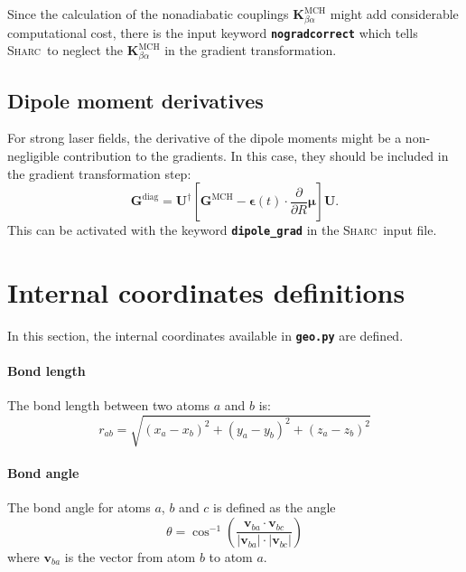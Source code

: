 \documentclass[a4paper,10pt,DIV=15,openany,twoside=false]{scrbook}
\newcommand{\sharc}{\textsc{Sharc}}
\newcommand{\ttt}[1]{\textbf{\texttt{#1}}}
\newcommand{\VEC}[1]{\ensuremath{\mathbf{#1}}}
\begin{document}
Since the calculation of the nonadiabatic couplings $\VEC{K}^{\text{MCH}}_{\beta\alpha}$ might add considerable computational cost, there is the input keyword \ttt{nogradcorrect} which tells \sharc\ to neglect the $\VEC{K}^{\text{MCH}}_{\beta\alpha}$ in the gradient transformation.

\subsection{Dipole moment derivatives}\label{met:dipolegrad}

For strong laser fields, the derivative of the dipole moments might be a non-negligible contribution to the gradients. In this case, they should be included in the gradient transformation step:
\begin{equation}
  \VEC{G}^{\text{diag}}=\VEC{U}^\dagger
  \left[
    \VEC{G}^{\text{MCH}}
    -\boldsymbol{\epsilon}(t)\cdot\frac{\partial}{\partial R}\boldsymbol{\mu}
  \right]\VEC{U}.
\end{equation}
This can be activated with the keyword \ttt{dipole\_grad} in the \sharc\ input file.



\section{Internal coordinates definitions}\label{met:geo}

In this section, the internal coordinates available in \ttt{geo.py} are defined.

\paragraph{Bond length}

The bond length between two atoms $a$ and $b$ is:
\begin{equation}
  r_{ab}=
  \sqrt{
    (x_a-x_b)^2+(y_a-y_b)^2+(z_a-z_b)^2
  }
\end{equation}

\paragraph{Bond angle}

The bond angle for atoms $a$, $b$ and $c$ is defined as the angle
\begin{equation}
  \theta=
  \cos^{-1}\left(
    \frac{\VEC{v}_{ba}\cdot\VEC{v}_{bc}}{|\VEC{v}_{ba}|\cdot|\VEC{v}_{bc}|}
  \right)\label{eq:angle}
\end{equation}
where $\VEC{v}_{ba}$ is the vector from atom $b$ to atom $a$.
\end{document}
